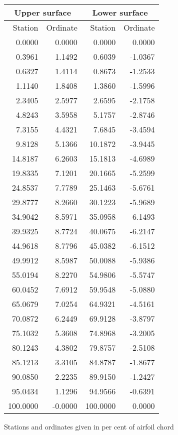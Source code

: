 \documentclass[11pt]{book}
\begin{document}
 \hspace{4mm}
 \begin{tabular}{|r|r|r|r|} \hline 
 \multicolumn{2}{|c|}{Upper surface} & \multicolumn{2}{|c|}{Lower surface} \\
 \hline
 Station & Ordinate & Station & Ordinate \\
 \hline
0.0000 & 0.0000 & 0.0000 & 0.0000 \\
0.3961 & 1.1492 & 0.6039 & -1.0367 \\
0.6327 & 1.4114 & 0.8673 & -1.2533 \\
1.1140 & 1.8408 & 1.3860 & -1.5996 \\
2.3405 & 2.5977 & 2.6595 & -2.1758 \\
4.8243 & 3.5958 & 5.1757 & -2.8746 \\
7.3155 & 4.4321 & 7.6845 & -3.4594 \\
9.8128 & 5.1366 & 10.1872 & -3.9445 \\
14.8187 & 6.2603 & 15.1813 & -4.6989 \\
19.8335 & 7.1201 & 20.1665 & -5.2599 \\
24.8537 & 7.7789 & 25.1463 & -5.6761 \\
29.8777 & 8.2660 & 30.1223 & -5.9689 \\
34.9042 & 8.5971 & 35.0958 & -6.1493 \\
39.9325 & 8.7724 & 40.0675 & -6.2147 \\
44.9618 & 8.7796 & 45.0382 & -6.1512 \\
49.9912 & 8.5987 & 50.0088 & -5.9386 \\
55.0194 & 8.2270 & 54.9806 & -5.5747 \\
60.0452 & 7.6912 & 59.9548 & -5.0880 \\
65.0679 & 7.0254 & 64.9321 & -4.5161 \\
70.0872 & 6.2449 & 69.9128 & -3.8797 \\
75.1032 & 5.3608 & 74.8968 & -3.2005 \\
80.1243 & 4.3802 & 79.8757 & -2.5108 \\
85.1213 & 3.3105 & 84.8787 & -1.8677 \\
90.0850 & 2.2235 & 89.9150 & -1.2427 \\
95.0434 & 1.1296 & 94.9566 & -0.6391 \\
100.0000 & -0.0000 & 100.0000 & 0.0000 \\
 \hline 
 \end{tabular}
 \vspace{8mm}

Stations and ordinates given in per cent of airfoil chord
\end{document}
